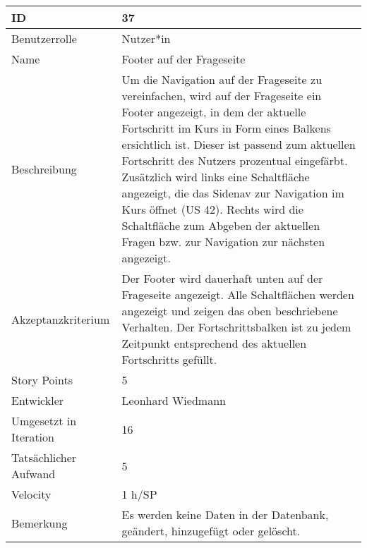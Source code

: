 \begin{tabularx}{\textwidth}{|p{}|X|}
	\hline
	ID & 37\\
	\hline
	Benutzerrolle & Nutzer*in\\
	\hline
	Name & Footer auf der Frageseite\\
	\hline
	Beschreibung & Um die Navigation auf der Frageseite zu vereinfachen, wird auf der Frageseite ein Footer angezeigt, in dem der aktuelle Fortschritt im Kurs in Form eines Balkens ersichtlich ist. Dieser ist passend zum aktuellen Fortschritt des Nutzers prozentual eingefärbt. Zusätzlich wird links eine Schaltfläche angezeigt, die das Sidenav zur Navigation im Kurs öffnet (US 42). Rechts wird die Schaltfläche zum Abgeben der aktuellen Fragen bzw. zur Navigation zur nächsten angezeigt.\\
	\hline
	Akzeptanzkriterium & Der Footer wird dauerhaft unten auf der Frageseite angezeigt. Alle Schaltflächen werden angezeigt und zeigen das oben beschriebene Verhalten. Der Fortschrittsbalken ist zu jedem Zeitpunkt entsprechend des aktuellen Fortschritts gefüllt.\\
	\hline
	Story Points & 5\\
	\hline
	Entwickler & Leonhard Wiedmann\\
	\hline
	Umgesetzt in Iteration & 16\\
	\hline
	Tatsächlicher Aufwand & 5 \\
	\hline
	Velocity & 1 h/SP\\
	\hline
	Bemerkung & Es werden keine Daten in der Datenbank, geändert, hinzugefügt oder gelöscht.\\
	\hline
\end{tabularx}
\vspace{20pt}
